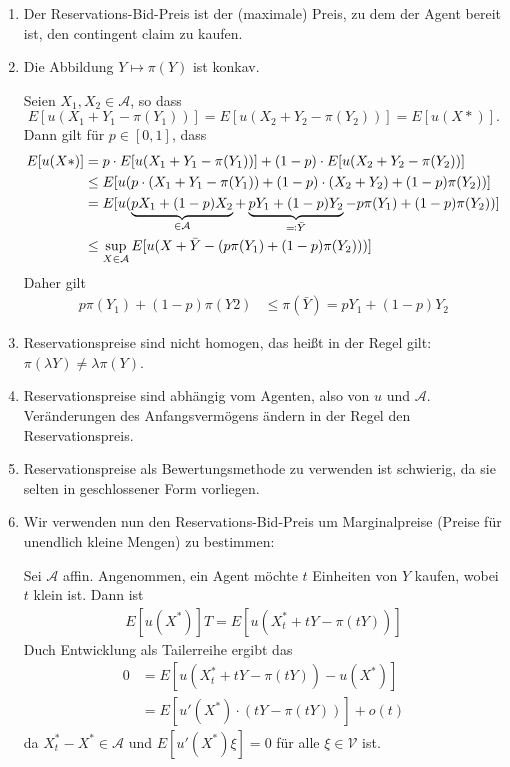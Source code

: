 \documentclass[a4paper,twoside,DIV15,BCOR12mm]{scrbook}
\newcommand{\cA}{\mathcal A}
\newcommand{\cV}{\mathcal V}
\begin{document}
\begin{bemerkung}
\begin{enumerate}
\item Der Reservations-Bid-Preis ist der (maximale) Preis, zu dem der Agent bereit ist, den contingent claim zu kaufen.
\item Die Abbildung $Y\mapsto\pi(Y)$ ist konkav.
\begin{beweis}
Seien $X_1,X_2\in\cA$, so dass
\[E[u(X_1 + Y_1 - \pi(Y_1))] = E[u(X_2+Y_2-\pi(Y_2))] = E[u(X*)].\]
Dann gilt für $p\in[0, 1]$, dass
\begin{align*}
E[u(X*)] &= p\cdot E[u(X_1+Y_1-\pi(Y_1))] + (1-p)\cdot E[u(X_2+Y_2-\pi(Y_2))]\\
&\le E[u(p\cdot(X_1+Y_1-\pi(Y_1)) + (1-p)\cdot(X_2+Y_2) + (1-p)\pi(Y_2))] \\
&= E[u(\underbrace{p X_1 + (1-p) X_2}_{\in\cA} + \underbrace{p Y_1 + (1-p)Y_2}_{\ad \bar Y} - p \pi(Y_1) + (1-p) \pi(Y_2))] \\
&\le \sup_{X\in\cA} E[u(X + \bar Y - (p\pi(Y_1) + (1-p) \pi(Y_2)))]
\end{align*}
Daher gilt
\begin{align*}
p\pi(Y_1)+ (1-p)\pi(Y2) &\le \pi(\bar Y) = p Y_1 + (1-p)Y_2
\end{align*}
\end{beweis}

\item Reservationspreise sind nicht homogen, das heißt in der Regel gilt: $\pi(\lambda Y) \ne \lambda \pi(Y)$.
\item Reservationspreise sind abhängig vom Agenten, also von $u$ und $\cA$. Veränderungen des Anfangsvermögens ändern in der Regel den Reservationspreis.
\item Reservationspreise als Bewertungsmethode zu verwenden ist schwierig, da sie selten in geschlossener Form vorliegen.
\item Wir verwenden nun den Reservations-Bid-Preis um Marginalpreise (Preise für unendlich kleine Mengen) zu bestimmen:

Sei $\cA$ affin. Angenommen, ein Agent möchte $t$ Einheiten von $Y$ kaufen, wobei $t$ klein ist. Dann ist 
\begin{align*}
E[u(X^*)]T=E[u(X_t^* + tY - \pi(tY))]
\end{align*}
Duch Entwicklung als Tailerreihe ergibt das
\begin{align*}
0
&= E[u(X_t^* + tY -\pi(tY)) - u(X^*)] \\
&= E[u'(X^*) \cdot (tY - \pi(tY))] + o(t)
\end{align*}
da $X_t^* - X^*\in\cA$ und $E[u'(X^*)\xi]=0$ für alle $\xi\in\cV$ ist.


\end{enumerate}
\end{bemerkung}
\end{document}
